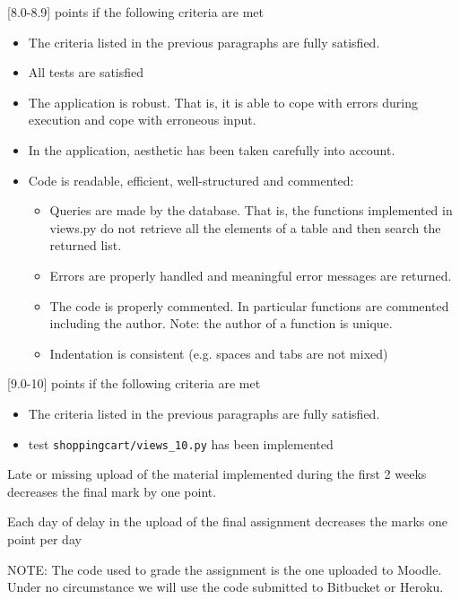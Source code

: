 \documentclass[12pt]{article} %
\newcommand{\ttt}[1]{\texttt{#1}}%
\begin{document}
[8.0-8.9] points if the following criteria are met
 \begin{itemize}
 \item The criteria listed in the previous paragraphs are fully satisfied.
 \item All tests are satisfied
 \item The application is robust. That is, it is able to cope with errors during execution and cope with erroneous input.
 \item In the application, aesthetic has been taken carefully into account.
 \item Code is readable, efficient, well-structured and commented:
    \begin{itemize}
        \item Queries are made by the database. That is, the functions implemented in views.py do not retrieve all the elements of a table and then search the returned list.
        \item  Errors are properly handled and meaningful error messages are returned.
        \item  The code is properly commented. In particular functions are commented including the author. Note: the author of a function is unique.
        \item Indentation is consistent (e.g. spaces and tabs are not mixed)
    \end{itemize}
 
\end{itemize}

[9.0-10] points if the following criteria are met
 \begin{itemize}
 \item The criteria listed in the previous paragraphs are fully satisfied.
 \item test \ttt{shoppingcart/views\_10.py} has been implemented
 \end{itemize}

Late or missing upload of the material implemented during the first 2 weeks decreases the final mark by one point.

Each day of delay in the upload of the final assignment decreases the marks one point per day

NOTE: The code used to grade the assignment is the one uploaded to Moodle. Under no circumstance we will use the code submitted to Bitbucket or Heroku.
\end{document}
